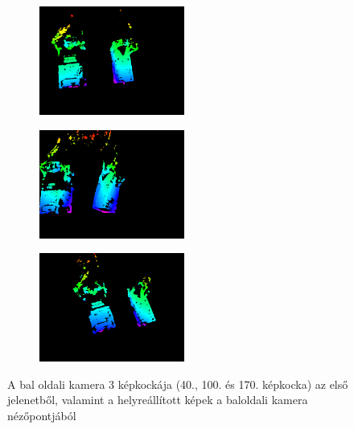 \begin{figure}[tbh]
\begin{subfigure}[b]{.32\linewidth}
	\centering
	\includegraphics[width=135pt]{figures/vis_93.png}
  \end{subfigure}
\begin{subfigure}[b]{.32\linewidth}
	\centering
	\includegraphics[width=135pt]{figures/vis_153.png}
  \end{subfigure}
\begin{subfigure}[b]{.32\linewidth}
	\centering
	\includegraphics[width=135pt]{figures/vis_223.png}
  \end{subfigure}
\caption{A bal oldali kamera 3 képkockája (40., 100. és 170. képkocka) az első jelenetből, valamint a helyreállított képek a baloldali kamera nézőpontjából \label{fig:scene1_frames}}
\end{figure}

